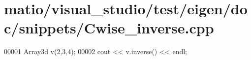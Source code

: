 \hypertarget{matio_2visual__studio_2test_2eigen_2doc_2snippets_2_cwise__inverse_8cpp_source}{}\section{matio/visual\+\_\+studio/test/eigen/doc/snippets/\+Cwise\+\_\+inverse.cpp}
\label{matio_2visual__studio_2test_2eigen_2doc_2snippets_2_cwise__inverse_8cpp_source}

\begin{DoxyCode}
00001 Array3d v(2,3,4);
00002 cout << v.inverse() << endl;
\end{DoxyCode}
